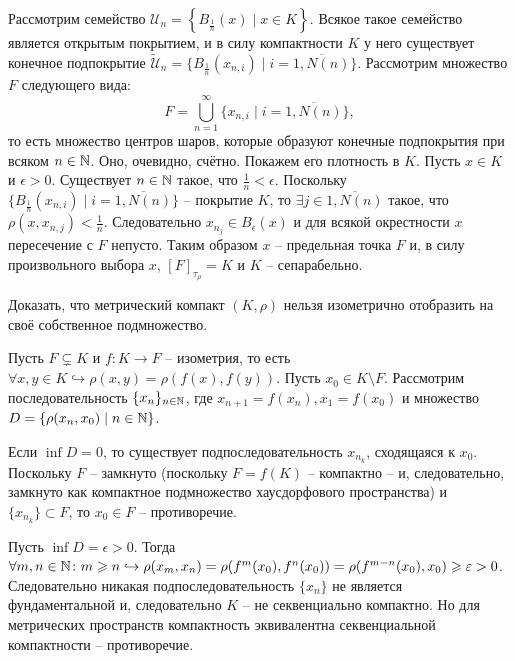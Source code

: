 \begin{solve} %
    Рассмотрим семейство $\mathcal{U}_n = \left\{B_{\frac{1}{n}}(x) \mid x \in K\right\}$. Всякое такое семейство является открытым покрытием, и в силу компактности $K$ у него существует конечное подпокрытие $\tilde{\mathcal{U}}_n = \{B_{\frac{1}{n}}(x_{n, i}) \mid i = \overline{1, N(n)}\}$. Рассмотрим множество $F$ следующего вида:
    \[
        F = \bigcup_{n = 1}^{\infty} \{x_{n, i} \mid i = \overline{1, N(n)}\},
    \]
    то есть множество центров шаров, которые образуют конечные подпокрытия при всяком $n \in \mathbb{N}$. Оно, очевидно, счётно. Покажем его плотность в $K$.
    Пусть $x \in K$ и $\epsilon > 0$. Существует $n \in \mathbb{N}$ такое, что $\frac{1}{n} < \epsilon$. Поскольку $\{B_{\frac{1}{n}}(x_{n, i}) \mid i = \overline{1, N(n)}\}$ -- покрытие $K$, то $\exists j \in \overline{1, N(n)}$ такое, что $\rho(x, x_{n,j}) < \frac{1}{n}$. Следовательно $x_{n_j} \in B_\epsilon(x)$ и для всякой окрестности $x$ пересечение с $F$ непусто. Таким образом $x$ -- предельная точка $F$ и, в силу произвольного выбора $x$, $[F]_{\tau_\rho} = K$ и $K$ -- сепарабельно.
\end{solve}
\begin{task}[\S 3.10]
    Доказать, что метрический компакт $(K, \rho)$ нельзя изометрично отобразить на своё собственное подмножество.
\end{task}
\begin{solve} %
    Пусть $F \subsetneq K$ и $f\colon K \to F$ -- изометрия, то есть $\forall x, y \in K \hookrightarrow \rho(x, y) = \rho(f(x), f(y))$.
    Пусть $x_0 \in K \setminus F$. Рассмотрим последовательность $\{x_n\}_{n \in \mathbb{N}}$, где $x_{n + 1} = f(x_{n}), x_1 = f(x_0)$ и множество $D = \{\rho(x_n, x_0) \mid n \in \mathbb{N}\}$.

    Если $\inf D = 0$, то существует подпоследовательность $x_{n_k}$, сходящаяся к $x_0$. Поскольку $F$ -- замкнуто (поскольку $F = f(K)$ -- компактно -- и, следовательно, замкнуто как компактное подмножество хаусдорфового пространства) и $\{x_{n_k}\} \subset F$, то $x_0 \in F$ -- противоречие.

    Пусть $\inf D = \epsilon > 0$. Тогда $\forall m, n \in \mathbb{N}\colon m \geqslant n \hookrightarrow \rho(x_m, x_n) = \rho(f^m(x_0), f^n(x_0)) = \rho(f^{m - n}(x_0), x_0) \geqslant \varepsilon > 0$. Следовательно никакая подпоследовательность $\{x_n\}$ не является фундаментальной и, следовательно $K$ -- не секвенциально компактно. Но для метрических пространств компактность эквивалентна секвенциальной компактности -- противоречие.
\end{solve}
